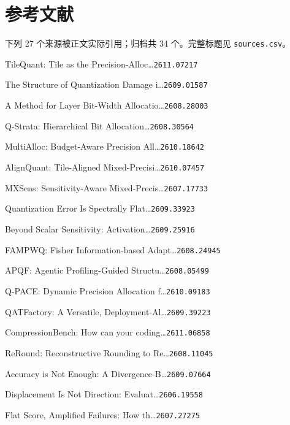 \section*{参考文献}
\begingroup
\scriptsize
\setlength{\parindent}{0pt}
\setlength{\parskip}{1.4pt}
\begin{refs}
\noindent 下列 27 个来源被正文实际引用；归档共 34 个。完整标题见 \texttt{sources.csv}。\par
[1] TileQuant: Tile as the Precision-Alloc\ldots{}\hfill{\texttt{2611.07217}}\par
[2] The Structure of Quantization Damage i\ldots{}\hfill{\texttt{2609.01587}}\par
[3] A Method for Layer Bit-Width Allocatio\ldots{}\hfill{\texttt{2608.28003}}\par
[4] Q-Strata: Hierarchical Bit Allocation\ldots{}\hfill{\texttt{2608.30564}}\par
[5] MultiAlloc: Budget-Aware Precision All\ldots{}\hfill{\texttt{2610.18642}}\par
[6] AlignQuant: Tile-Aligned Mixed-Precisi\ldots{}\hfill{\texttt{2610.07457}}\par
[7] MXSens: Sensitivity-Aware Mixed-Precis\ldots{}\hfill{\texttt{2607.17733}}\par
[8] Quantization Error Is Spectrally Flat\ldots{}\hfill{\texttt{2609.33923}}\par
[9] Beyond Scalar Sensitivity: Activation\ldots{}\hfill{\texttt{2609.25916}}\par
[10] FAMPWQ: Fisher Information-based Adapt\ldots{}\hfill{\texttt{2608.24945}}\par
[11] APQF: Agentic Profiling-Guided Structu\ldots{}\hfill{\texttt{2608.05499}}\par
[12] Q-PACE: Dynamic Precision Allocation f\ldots{}\hfill{\texttt{2610.09183}}\par
[13] QATFactory: A Versatile, Deployment-Al\ldots{}\hfill{\texttt{2609.39223}}\par
[14] CompressionBench: How can your coding\ldots{}\hfill{\texttt{2611.06858}}\par
[15] ReRound: Reconstructive Rounding to Re\ldots{}\hfill{\texttt{2608.11045}}\par
[16] Accuracy is Not Enough: A Divergence-B\ldots{}\hfill{\texttt{2609.07664}}\par
[17] Displacement Is Not Direction: Evaluat\ldots{}\hfill{\texttt{2606.19558}}\par
[18] Flat Score, Amplified Failures: How th\ldots{}\hfill{\texttt{2607.27275}}\par

\end{refs}
